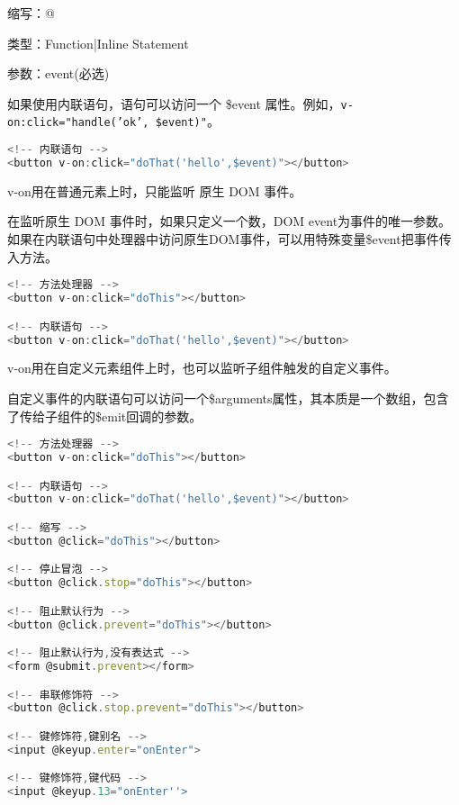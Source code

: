 \begin{compactitem}
\item 缩写：@
\item 类型：Function|Inline Statement
\item 参数：event(必选)
\end{compactitem}


如果使用内联语句，语句可以访问一个 \$event 属性。例如，\texttt{v-on:click="handle('ok', \$event)"}。

\begin{lstlisting}[language=JavaScript]
<!-- 内联语句 -->
<button v-on:click="doThat('hello',$event)"></button>
\end{lstlisting}

\begin{compactitem}
\item v-on用在普通元素上时，只能监听 原生 DOM 事件。

在监听原生 DOM 事件时，如果只定义一个数，DOM event为事件的唯一参数。如果在内联语句中处理器中访问原生DOM事件，可以用特殊变量\$event把事件传入方法。


\begin{lstlisting}[language=JavaScript]
<!-- 方法处理器 -->
<button v-on:click="doThis"></button>

<!-- 内联语句 -->
<button v-on:click="doThat('hello',$event)"></button>
\end{lstlisting}


\item v-on用在自定义元素组件上时，也可以监听子组件触发的自定义事件。

自定义事件的内联语句可以访问一个\$arguments属性，其本质是一个数组，包含了传给子组件的\$emit回调的参数。



\end{compactitem}


\begin{lstlisting}[language=JavaScript]
<!-- 方法处理器 -->
<button v-on:click="doThis"></button>

<!-- 内联语句 -->
<button v-on:click="doThat('hello',$event)"></button>

<!-- 缩写 -->
<button @click="doThis"></button>

<!-- 停止冒泡 -->
<button @click.stop="doThis"></button>

<!-- 阻止默认行为 -->
<button @click.prevent="doThis"></button>

<!-- 阻止默认行为,没有表达式 -->
<form @submit.prevent></form>

<!-- 串联修饰符 -->
<button @click.stop.prevent="doThis"></button>

<!-- 键修饰符,键别名 -->
<input @keyup.enter="onEnter">

<!-- 键修饰符,键代码 -->
<input @keyup.13="onEnter''>
\end{lstlisting}

